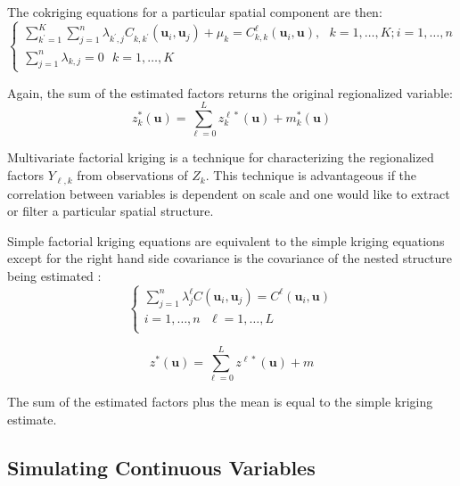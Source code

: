 The cokriging equations for a particular spatial component are then:
\begin{equation*}
    \begin{cases}
        \sum_{k^{\prime}=1}^{K} \sum_{j=1}^{n} \lambda_{k^{\prime},j} C_{k,k^{\prime}}(\mathbf{u}_{i}, \mathbf{u}_{j}) + \mu_{k} = C_{k,k}^{\ell}(\mathbf{u}_{i},\mathbf{u}), \ \ \ k=1,\dots,K; i=1,\dots,n \\
        \sum_{j=1}^{n} \lambda_{k,j} = 0  \ \ \ k=1,\dots,K
    \end{cases}
\end{equation*}

Again, the sum of the estimated factors returns the original regionalized variable:
\begin{equation*}
    z^{*}_{k}(\mathbf{u}) = \sum_{\ell=0}^{L} z^{\ell*}_{k}(\mathbf{u}) + m^{*}_{k}(\mathbf{u})
\end{equation*}

Multivariate factorial kriging is a technique for characterizing the regionalized factors $Y_{\ell,k}$ from observations of $Z_{k}$. This technique is advantageous if the correlation between variables is dependent on scale and one would like to extract or filter a particular spatial structure.

Simple factorial kriging equations are equivalent to the simple kriging equations except for the right hand side covariance is the covariance of the nested structure being estimated \citep{hong2007improved}:
\begin{equation*}
    \begin{cases}
        \sum_{j=1}^{n} \lambda_{j}^{\ell} C(\mathbf{u}_{i}, \mathbf{u}_{j}) = C^{\ell}(\mathbf{u}_{i}, \mathbf{u}) \\
        i=1,\dots,n \ \ \ \ell=1,\dots,L                                                                           \\
    \end{cases}
\end{equation*}

\begin{equation*}
    z^{*}(\mathbf{u}) = \sum_{\ell=0}^{L} z^{\ell*}(\mathbf{u}) + m
\end{equation*}

The sum of the estimated factors plus the mean is equal to the simple kriging estimate.

\FloatBarrier
\subsection{Simulating Continuous Variables}
\label{subsec:03simulate}

